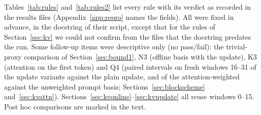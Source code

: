\documentclass[10pt]{article}
\theoremstyle{plain}
\theoremstyle{definition}
\theoremstyle{remark}
\newcommand{\rl}[1]{\textsf{#1}}%
\begin{document}
Tables~\ref{tab:rules} and~\ref{tab:rules2} list every rule with its verdict as recorded in the results files (Appendix~\ref{app:repro} names the fields). All were fixed in advance, in the docstring of their script, except that for the rules of Section~\ref{sec:kv} we could not confirm from the files that the docstring predates the run. Some follow-up items were descriptive only (no pass/fail): the trivial-proxy comparison of Section~\ref{sec:bound1}, \rl{N3} (offline basis with the update), \rl{K3} (attention on the first token) and \rl{Q4} (paired intervals on fresh windows 16--31 of the update variants against the plain update, and of the attention-weighted against the unweighted prompt basis; Sections~\ref{sec:blockscheme} and~\ref{sec:kvattn}). Sections~\ref{sec:kvonline}--\ref{sec:kvupdate} all reuse windows 0--15. Post hoc comparisons are marked in the text.
\end{document}
